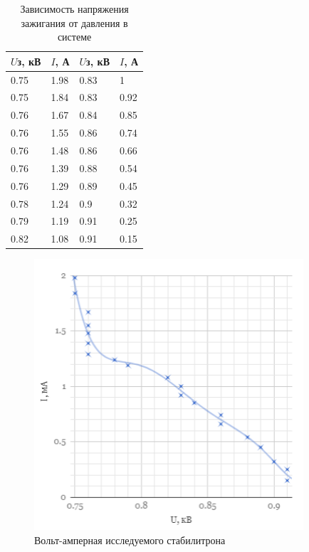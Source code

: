 \documentclass[a4paper]{article}
\begin{document}
\begin{table}[H]
    \centering
    \begin{center}
    \caption{Зависимость напряжения зажигания от давления в системе}
        \label{tab:my_label}
    \end{center}
   \begin{tabular}{ |p{2cm}|p{2cm}||p{2cm}| p{2cm}| }

 \hline
 $U$з, кВ & $I$, А & $U$з, кВ & $I$, А   \\
\hline
\hline

0.75 & 1.98 & 0.83 & 1 \\
\hline
0.75 & 1.84 & 0.83 & 0.92\\
\hline
0.76 & 1.67 & 0.84 & 0.85\\
\hline
0.76 & 1.55 & 0.86 & 0.74\\
\hline
0.76 & 1.48 & 0.86 & 0.66\\
\hline
0.76 & 1.39 & 0.88 & 0.54\\
\hline
0.76 & 1.29 & 0.89 & 0.45\\
\hline
0.78 & 1.24 & 0.9 & 0.32\\
\hline
0.79 & 1.19 & 0.91 & 0.25\\
\hline
0.82 & 1.08 & 0.91 & 0.15\\
 \hline
\end{tabular}

\end{table}

\begin{figure}[H]
\begin{center}
\includegraphics[width=10cm]{vach.PNG}
\caption{Вольт-амперная исследуемого стабилитрона}
\label{ris:experimoriginal} %

\end{center}
\end{figure}
\end{document}
